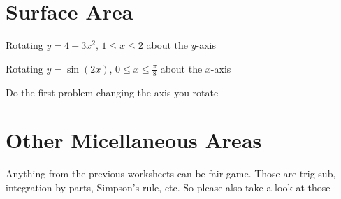 \ee
\newpage
\section{Surface Area}
\be
\item Rotating $y=4+3x^2$, $1\leq x\leq 2$ about the $y$-axis
\vfill
\item Rotating $y=\sin(2x)$, $0\leq x\leq \frac{\pi}{8}$ about the $x$-axis\vfill
\item Do the first problem changing the axis you rotate\vfill
\ee
\section{Other Micellaneous Areas}
Anything from the previous worksheets can be fair game. Those are trig sub, integration by parts, Simpson's rule, etc. So please also take a look at those
\ee
